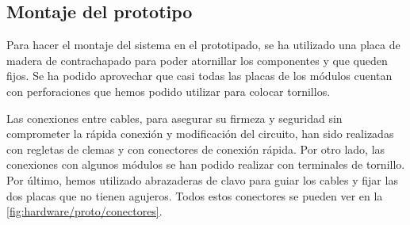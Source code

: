 \subsection{Montaje del prototipo}

Para hacer el montaje del sistema en el prototipado, se ha utilizado una placa de madera de contrachapado para poder atornillar los componentes y que queden fijos. Se ha podido aprovechar que casi todas las placas de los módulos cuentan con perforaciones que hemos podido utilizar para colocar tornillos. 

Las conexiones entre cables, para asegurar su firmeza y seguridad sin comprometer la rápida conexión y modificación del circuito, han sido realizadas con regletas de clemas y con conectores de conexión rápida. Por otro lado, las conexiones con algunos módulos se han podido realizar con terminales de tornillo. Por último, hemos utilizado abrazaderas de clavo para guiar los cables y fijar las dos placas que no tienen agujeros. Todos estos conectores se pueden ver en la \autoref{fig:hardware/proto/conectores}.
